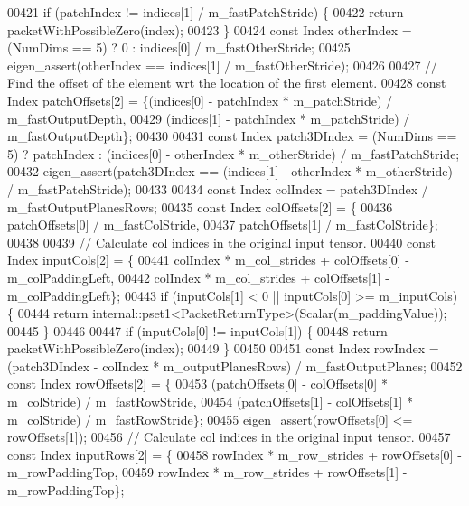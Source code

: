 \begin{DoxyCode}
00421     \textcolor{keywordflow}{if} (patchIndex != indices[1] / m\_fastPatchStride) \{
00422       \textcolor{keywordflow}{return} packetWithPossibleZero(index);
00423     \}
00424     \textcolor{keyword}{const} Index otherIndex = (NumDims == 5) ? 0 : indices[0] / m\_fastOtherStride;
00425     eigen\_assert(otherIndex == indices[1] / m\_fastOtherStride);
00426 
00427     \textcolor{comment}{// Find the offset of the element wrt the location of the first element.}
00428     \textcolor{keyword}{const} Index patchOffsets[2] = \{(indices[0] - patchIndex * m\_patchStride) / m\_fastOutputDepth,
00429                                    (indices[1] - patchIndex * m\_patchStride) / m\_fastOutputDepth\};
00430 
00431     \textcolor{keyword}{const} Index patch3DIndex = (NumDims == 5) ? patchIndex : (indices[0] - otherIndex * m\_otherStride) / 
      m\_fastPatchStride;
00432     eigen\_assert(patch3DIndex == (indices[1] - otherIndex * m\_otherStride) / m\_fastPatchStride);
00433 
00434     \textcolor{keyword}{const} Index colIndex = patch3DIndex / m\_fastOutputPlanesRows;
00435     \textcolor{keyword}{const} Index colOffsets[2] = \{
00436       patchOffsets[0] / m\_fastColStride,
00437       patchOffsets[1] / m\_fastColStride\};
00438 
00439     \textcolor{comment}{// Calculate col indices in the original input tensor.}
00440     \textcolor{keyword}{const} Index inputCols[2] = \{
00441       colIndex * m\_col\_strides + colOffsets[0] - m\_colPaddingLeft,
00442       colIndex * m\_col\_strides + colOffsets[1] - m\_colPaddingLeft\};
00443     \textcolor{keywordflow}{if} (inputCols[1] < 0 || inputCols[0] >= m\_inputCols) \{
00444       \textcolor{keywordflow}{return} internal::pset1<PacketReturnType>(Scalar(m\_paddingValue));
00445     \}
00446 
00447     \textcolor{keywordflow}{if} (inputCols[0] != inputCols[1]) \{
00448       \textcolor{keywordflow}{return} packetWithPossibleZero(index);
00449     \}
00450 
00451     \textcolor{keyword}{const} Index rowIndex = (patch3DIndex - colIndex * m\_outputPlanesRows) / m\_fastOutputPlanes;
00452     \textcolor{keyword}{const} Index rowOffsets[2] = \{
00453       (patchOffsets[0] - colOffsets[0] * m\_colStride) / m\_fastRowStride,
00454       (patchOffsets[1] - colOffsets[1] * m\_colStride) / m\_fastRowStride\};
00455     eigen\_assert(rowOffsets[0] <= rowOffsets[1]);
00456     \textcolor{comment}{// Calculate col indices in the original input tensor.}
00457     \textcolor{keyword}{const} Index inputRows[2] = \{
00458       rowIndex * m\_row\_strides + rowOffsets[0] - m\_rowPaddingTop,
00459       rowIndex * m\_row\_strides + rowOffsets[1] - m\_rowPaddingTop\};

\end{DoxyCode}
